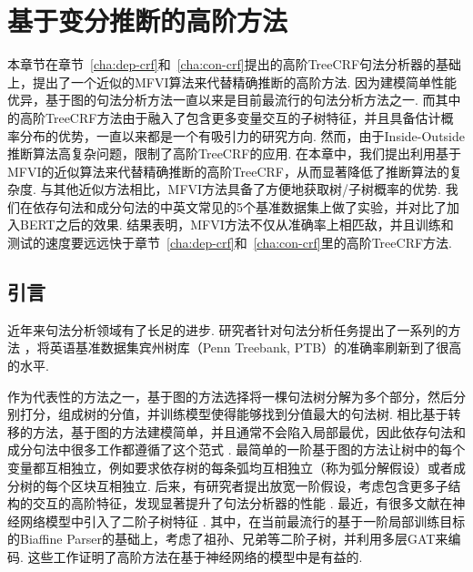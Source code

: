 \chapter{基于变分推断的高阶方法}
\label{cha:vi}

本章节在章节~\ref{cha:dep-crf}和~\ref{cha:con-crf}提出的高阶TreeCRF句法分析器的基础上，提出了一个近似的MFVI算法来代替精确推断的高阶方法.
因为建模简单性能优异，基于图的句法分析方法一直以来是目前最流行的句法分析方法之一.
而其中的高阶TreeCRF方法由于融入了包含更多变量交互的子树特征，并且具备估计概率分布的优势，一直以来都是一个有吸引力的研究方向.
然而，由于Inside-Outside推断算法高复杂问题，限制了高阶TreeCRF的应用.
在本章中，我们提出利用基于MFVI的近似算法来代替精确推断的高阶TreeCRF，从而显著降低了推断算法的复杂度.
与其他近似方法相比，MFVI方法具备了方便地获取树/子树概率的优势.
我们在依存句法和成分句法的中英文常见的5个基准数据集上做了实验，并对比了加入BERT之后的效果.
结果表明，MFVI方法不仅从准确率上相匹敌，并且训练和测试的速度要远远快于章节~\ref{cha:dep-crf}和~\ref{cha:con-crf}里的高阶TreeCRF方法.

\section{引言}\label{sec:vi-intro}
近年来句法分析领域有了长足的进步.
研究者针对句法分析任务提出了一系列的方法 \citep{dozat-etal-2017-biaffine,gomez-rodriguez-vilares-2018-constituent,ji-etal-2019-graph,zhang-etal-2020-fast,wei-etal-2020-span}，将英语基准数据集宾州树库（Penn Treebank, PTB）的准确率刷新到了很高的水平.

作为代表性的方法之一，基于图的方法选择将一棵句法树分解为多个部分，然后分别打分，组成树的分值，并训练模型使得能够找到分值最大的句法树.
相比基于转移的方法，基于图的方法建模简单，并且通常不会陷入局部最优，因此依存句法和成分句法中很多工作都遵循了这个范式 \citep{mcdonald-etal-2005-non,mcdonald-etal-2005-online,taskar-etal-2004-max}.
最简单的一阶基于图的方法让树中的每个变量都互相独立，例如要求依存树的每条弧均互相独立（称为弧分解假设）或者成分树的每个区块互相独立.
后来，有研究者提出放宽一阶假设，考虑包含更多子结构的交互的高阶特征，发现显著提升了句法分析器的性能 \citep{mcdonald-pereira-2006-online,koo-collins-2010-efficient,ma-zhao-2012-fourth}.
最近，有很多文献在神经网络模型中引入了二阶子树特征 \citep{chen-manning-2014-fast,ma-hovy-2017-neural,pei-etal-2015-effective}.
其中，\citet{ji-etal-2019-graph}在当前最流行的基于一阶局部训练目标的Biaffine Parser的基础上，考虑了祖孙、兄弟等二阶子树，并利用多层GAT来编码.
这些工作证明了高阶方法在基于神经网络的模型中是有益的.

